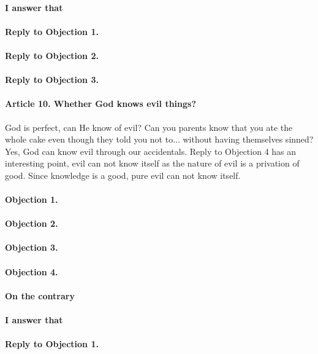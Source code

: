 \documentclass{ucetd}
\begin{document}
\paragraph{I answer that}
\paragraph{Reply to Objection 1.}
\paragraph{Reply to Objection 2.}
\paragraph{Reply to Objection 3.}

\paragraph{Article 10. Whether God knows evil things?}
God is perfect, can He know of evil? Can you parents know that you ate the whole cake even though they told you not to... without having themselves sinned? Yes, God can know evil through our accidentals. Reply to Objection 4 has an interesting point, evil can not know itself as the nature of evil is a privation of good. Since knowledge is a good, pure evil can not know itself.
\paragraph{Objection 1.}
\paragraph{Objection 2.}
\paragraph{Objection 3.}
\paragraph{Objection 4.}
\paragraph{On the contrary}
\paragraph{I answer that}
\paragraph{Reply to Objection 1.}
\end{document}
